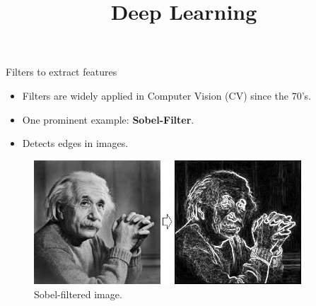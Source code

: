 




\newcommand{\titlefigure}{figure/alexnet.png}
\newcommand{\learninggoals}{
  \item Filters 
  \item 2D ConvNet
}

\title{Deep Learning}
\date{}




\begin{vbframe}{Filters to extract features}
    \begin{itemize}
        \item Filters are widely applied in Computer Vision (CV) since the 70's.
        \item One prominent example: \textbf{Sobel-Filter}.
        \item Detects edges in images.
    \end{itemize}
    \begin{figure}
        \centering
        \includegraphics[width=10cm]{figure/sobel_einstein.png}
        \caption{Sobel-filtered image.}
    \end{figure}
\framebreak


\end{vbframe}
